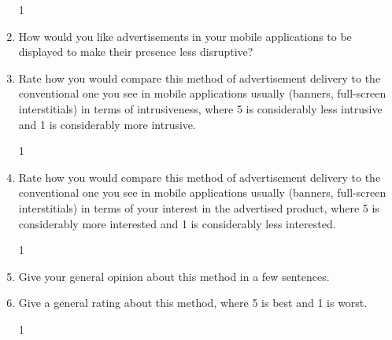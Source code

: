 \begin{enumerate}
1	\tab{}	\tab{}	\tab\tab	4	\tab\tab	5  
  
  \item How would you like advertisements in your mobile applications to be displayed to make their presence less disruptive?
  
\noindent\makebox[\linewidth]{\rule{\textwidth}{0.4pt}}
\noindent\makebox[\linewidth]{\rule{\textwidth}{0.4pt}}
\noindent\makebox[\linewidth]{\rule{\textwidth}{0.4pt}}
  
  \item Rate how you would compare this method of advertisement delivery to the conventional one you see in mobile applications usually (banners, full-screen interstitials) in terms of intrusiveness, where 5 is considerably less intrusive and 1 is considerably more intrusive.
  
1	\tab{}	\tab{}	\tab{}	\tab{}  
  
  \item Rate how you would compare this method of advertisement delivery to the conventional one you see in mobile applications usually (banners, full-screen interstitials) in terms of your interest in the advertised product, where 5 is considerably more interested and 1 is considerably less interested.
  
1	\tab{}	\tab{}	\tab{}	\tab{}  
  
  \item Give your general opinion about this method in a few sentences.
  
\noindent\makebox[\linewidth]{\rule{\textwidth}{0.4pt}}
\noindent\makebox[\linewidth]{\rule{\textwidth}{0.4pt}}
\noindent\makebox[\linewidth]{\rule{\textwidth}{0.4pt}}
  
  \item Give a general rating about this method, where 5 is best and 1 is worst.
  
1	\tab{}	\tab{}	\tab{}	\tab{}  
  
\end{enumerate}

